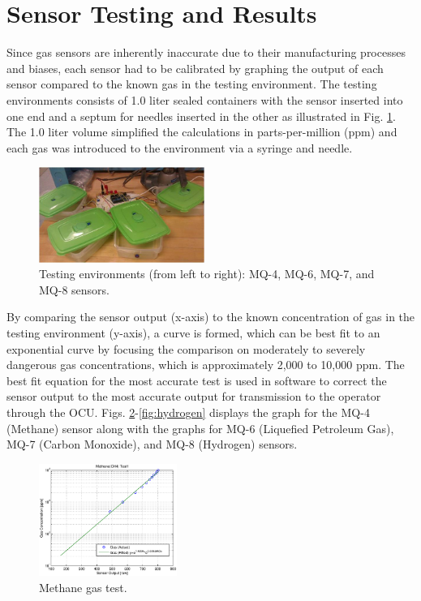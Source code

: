 \section{Sensor Testing and Results}\label{sec:results}

Since gas sensors are inherently inaccurate due to their manufacturing processes and biases, each sensor had to be calibrated by graphing the output of each sensor compared to the known gas in the testing environment. The testing environments consists of 1.0 liter sealed containers with the sensor inserted into one end and a septum for needles inserted in the other as illustrated in Fig. \ref{fig:sensor}. The 1.0 liter volume simplified the calculations in parts-per-million (ppm) and each gas was introduced to the environment via a syringe and needle.

\begin{figure}
	\centering
	\includegraphics[width=0.48\textwidth]{./pictures/sensor.jpg}
	\caption{Testing environments (from left to right): MQ-4, MQ-6, MQ-7, and MQ-8 sensors.}
	\label{fig:sensor}
\end{figure}

By comparing the sensor output (x-axis) to the known concentration of gas in the testing environment (y-axis), a curve is formed, which can be best fit to an exponential curve by focusing the comparison on moderately to severely dangerous gas concentrations, which is approximately 2,000 to 10,000 ppm. The best fit equation for the most accurate test is used in software to correct the sensor output to the most accurate output for transmission to the operator through the OCU. Figs. \ref{fig:methanetest}-\ref{fig:hydrogen} displays the graph for the MQ-4 (Methane) sensor along with the graphs for MQ-6 (Liquefied Petroleum Gas), MQ-7 (Carbon Monoxide), and MQ-8 (Hydrogen) sensors.

\begin{figure}
	\centering
	\includegraphics[width=0.4\textwidth]{./matlab/MethaneTest1.eps}
	\caption{Methane gas test.}
	\label{fig:methanetest}
\end{figure}

